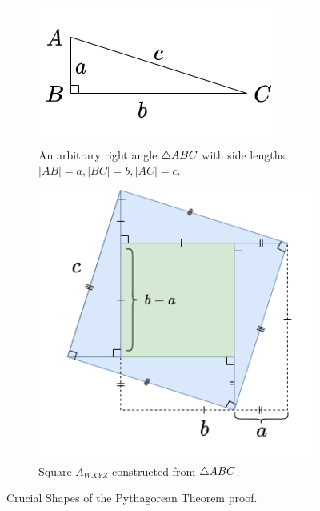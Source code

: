 \begin{figure}
    \begin{subfigure}{0.4\linewidth}
        \includegraphics[width=\linewidth]
        {src/direct_src/pythagorean-triangle.png}
        \caption{An arbitrary right angle ${\triangle ABC}$ 
        with side lengths $|AB| = a, |BC| = b, |AC| = c.$}
    \end{subfigure}
    \begin{subfigure}{0.5\linewidth}
        \includegraphics[width=\linewidth]
        {src/direct_src/pythagorean-final.png}
        \caption{Square $A_{WXYZ}$ constructed from ${\triangle ABC}$.}
    \end{subfigure}
    \caption{Crucial Shapes of the Pythagorean Theorem proof.}
     \label{direct: fig: pyth}
\end{figure}

